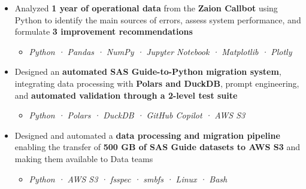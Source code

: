 \documentclass[10pt,english,french]{article}
\begin{document}
\vspace{-5pt}
\begin{itemize}[leftmargin=0.5cm, label=\textbullet, itemsep=0.05em]
    \item Analyzed \textbf{1 year of operational data} from the \textbf{Zaion Callbot}
          using Python to identify the main sources of errors,
          assess system performance, and formulate \textbf{3 improvement recommendations}
          \begin{itemize}[leftmargin=0.25cm,label=\textendash,itemsep=0em,topsep=0.1em]
              \item \textit{\fontsize{10pt}{9pt}\selectfont Python · Pandas · NumPy · Jupyter Notebook · Matplotlib · Plotly}
          \end{itemize}

    \item Designed an \textbf{automated SAS Guide-to-Python migration system},
          integrating data processing with \textbf{Polars and DuckDB},
          prompt engineering, and \textbf{automated validation through a 2-level test suite}
          \begin{itemize}[leftmargin=0.25cm,label=\textendash,itemsep=0em,topsep=0.1em]
              \item \textit{\fontsize{10pt}{9pt}\selectfont Python · Polars · DuckDB · GitHub Copilot · AWS S3}
          \end{itemize}

    \item Designed and automated a \textbf{data processing and migration pipeline}
          enabling the transfer of \textbf{500\raisebox{0.20ex}{\small +} GB of SAS Guide datasets to AWS S3}
          and making them available to Data teams
          \begin{itemize}[leftmargin=0.25cm,label=\textendash,itemsep=0em,topsep=0.1em]
              \item \textit{\fontsize{10pt}{9pt}\selectfont Python · AWS S3 · fsspec · smbfs · Linux · Bash}
          \end{itemize}



\end{itemize}
\end{document}
